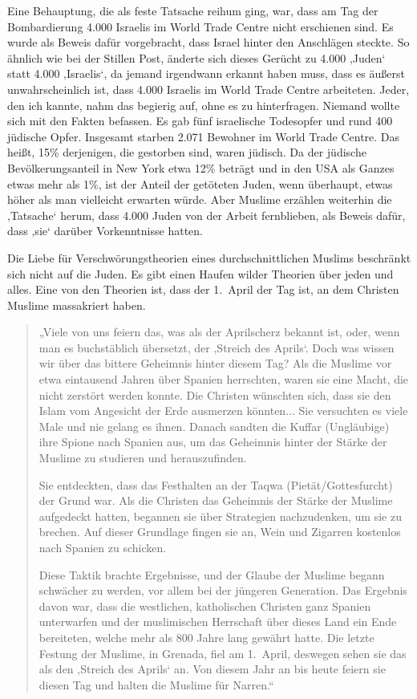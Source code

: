 \documentclass[12pt]{memoir}
\def\/{\hskip0pt/\hskip0pt}
\begin{document}
Eine Behauptung, die als feste Tatsache reihum ging, war,
dass am Tag der Bombardierung 4.000 Israelis
im World Trade Centre nicht erschienen sind.
Es wurde als Beweis dafür vorgebracht,
dass Israel hinter den Anschlägen steckte.
So ähnlich wie bei der Stillen Post,
änderte sich dieses Gerücht zu 4.000 ‚Juden‘ statt 4.000 ‚Israelis‘,
da jemand irgendwann erkannt haben muss,
dass es äußerst unwahrscheinlich ist,
dass 4.000 Israelis im World Trade Centre arbeiteten.
Jeder, den ich kannte, nahm das begierig auf, ohne es zu hinterfragen.
Niemand wollte sich mit den Fakten befassen.
Es gab fünf israelische Todesopfer und rund 400 jüdische Opfer.
Insgesamt starben 2.071 Bewohner im World Trade Centre.
Das heißt, 15\% derjenigen, die gestorben sind, waren jüdisch.
Da der jüdische Bevölkerungsanteil in New York etwa 12\% beträgt
und in den USA als Ganzes etwas mehr als 1\%,
ist der Anteil der getöteten Juden, wenn überhaupt,
etwas höher als man vielleicht erwarten würde.
Aber Muslime erzählen weiterhin die ‚Tatsache‘ herum,
dass 4.000 Juden von der Arbeit fernblieben,
als Beweis dafür, dass ‚sie‘ darüber Vorkenntnisse hatten.

Die Liebe für Verschwörungstheorien eines durchschnittlichen Muslims
beschränkt sich nicht auf die Juden.
Es gibt einen Haufen wilder Theorien über jeden und alles.
Eine von den Theorien ist, dass der 1.\ April der Tag ist,
an dem Christen Muslime massakriert haben.

\begin{quote}
„Viele von uns feiern das, was als der Aprilscherz bekannt ist, oder,
wenn man es buchstäblich übersetzt, der ‚Streich des Aprils‘.
Doch was wissen wir über das bittere Geheimnis hinter diesem Tag?
Als die Muslime vor etwa eintausend Jahren über Spanien herrschten,
waren sie eine Macht, die nicht zerstört werden konnte.
Die Christen wünschten sich, dass sie den Islam
vom Angesicht der Erde ausmerzen könnten...
Sie versuchten es viele Male und nie gelang es ihnen.
Danach sandten die Kuffar (Ungläubige) ihre Spione nach Spanien aus,
um das Geheimnis hinter der Stärke der Muslime zu studieren und herauszufinden.

Sie entdeckten, dass das Festhalten an der Taqwa
(Pietät\/Gottesfurcht) der Grund war.
Als die Christen das Geheimnis der Stärke der Muslime aufgedeckt hatten,
begannen sie über Strategien nachzudenken, um sie zu brechen.
Auf dieser Grundlage fingen sie an,
Wein und Zigarren kostenlos nach Spanien zu schicken.

Diese Taktik brachte Ergebnisse,
und der Glaube der Muslime begann schwächer zu werden,
vor allem bei der jüngeren Generation.
Das Ergebnis davon war, dass die westlichen, katholischen Christen
ganz Spanien unterwarfen und der muslimischen Herrschaft
über dieses Land ein Ende bereiteten,
welche mehr als 800 Jahre lang gewährt hatte.
Die letzte Festung der Muslime, in Grenada, fiel am 1.\ April,
deswegen sehen sie das als den ‚Streich des Aprils‘ an.
Von diesem Jahr an bis heute feiern sie diesen Tag
und halten die Muslime für Narren.“
\end{quote}
\end{document}

